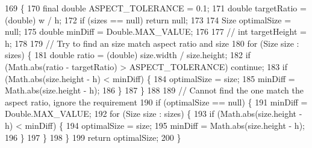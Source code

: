 \begin{DoxyCode}
169                                                                        \{
170         \textcolor{keyword}{final} \textcolor{keywordtype}{double} ASPECT\_TOLERANCE = 0.1;
171         \textcolor{keywordtype}{double} targetRatio = (double) w / h;
172         \textcolor{keywordflow}{if} (sizes == null) \textcolor{keywordflow}{return} null;
173 
174         Size optimalSize = null;
175         \textcolor{keywordtype}{double} minDiff = Double.MAX\_VALUE;
176 
177 \textcolor{comment}{//        int targetHeight = h;}
178 
179         \textcolor{comment}{// Try to find an size match aspect ratio and size}
180         \textcolor{keywordflow}{for} (Size size : sizes) \{
181             \textcolor{keywordtype}{double} ratio = (double) size.width / size.height;
182             if (Math.abs(ratio - targetRatio) > ASPECT\_TOLERANCE) \textcolor{keywordflow}{continue};
183             \textcolor{keywordflow}{if} (Math.abs(size.height - h) < minDiff) \{
184                 optimalSize = size;
185                 minDiff = Math.abs(size.height - h);
186             \}
187         \}
188 
189         \textcolor{comment}{// Cannot find the one match the aspect ratio, ignore the requirement}
190         \textcolor{keywordflow}{if} (optimalSize == null) \{
191             minDiff = Double.MAX\_VALUE;
192             \textcolor{keywordflow}{for} (Size size : sizes) \{
193                 \textcolor{keywordflow}{if} (Math.abs(size.height - h) < minDiff) \{
194                     optimalSize = size;
195                     minDiff = Math.abs(size.height - h);
196                 \}
197             \}
198         \}
199         \textcolor{keywordflow}{return} optimalSize;
200     \}
\end{DoxyCode}
\hypertarget{classit_1_1unibo_1_1torsello_1_1bluetoothpositioning_1_1util_1_1CameraPreviewUtil_a3b2897b27ca62e95df13f63d8d09e036_a3b2897b27ca62e95df13f63d8d09e036}{}\label{classit_1_1unibo_1_1torsello_1_1bluetoothpositioning_1_1util_1_1CameraPreviewUtil_a3b2897b27ca62e95df13f63d8d09e036_a3b2897b27ca62e95df13f63d8d09e036} 
